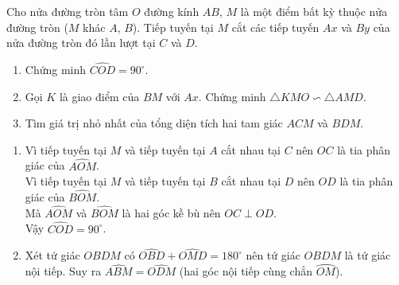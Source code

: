 \begin{ex}%
	Cho nửa đường tròn tâm $O$ đường kính $AB$, $M$ là một điểm bất kỳ thuộc nửa đường tròn ($M$ khác $A$, $B$). Tiếp tuyến tại $M$ cắt các tiếp tuyến $Ax$ và $By$ của nửa đường tròn đó lần lượt tại $C$ và $D$.
	\begin{enumerate}
	 \item Chứng minh $\widehat{COD}=90^\circ$.
	 \item Gọi $K$ là giao điểm của $BM$ với $Ax$. Chứng minh $\triangle KMO \backsim \triangle AMD$.
	 \item Tìm giá trị nhỏ nhất của tổng diện tích hai tam giác $ACM$ và $BDM$.
	\end{enumerate}
	\loigiai
	{
		\begin{center}
		\end{center}
		\begin{enumerate}
		 \item Vì tiếp tuyến tại $M$ và tiếp tuyến tại $A$ cắt nhau tại $C$ nên $OC$ là tia phân giác của $\widehat{AOM}$.\\
		 Vì tiếp tuyến tại $M$ và tiếp tuyến tại $B$ cắt nhau tại $D$ nên $OD$ là tia phân giác của $\widehat{BOM}$.\\
		 Mà $\widehat{AOM}$ và $\widehat{BOM}$ là hai góc kề bù nên $OC \perp OD$.\\
		 Vậy $\widehat{COD}=90^\circ$.
		 \item Xét tứ giác $OBDM$ có $\widehat{OBD}+\widehat{OMD}=180^\circ$ nên tứ giác $OBDM$ là tứ giác nội tiếp. Suy ra $\widehat{ABM}=\widehat{ODM}$ (hai góc nội tiếp cùng chắn $\wideparen{OM}$).\\

\end{enumerate}}
\end{ex}
